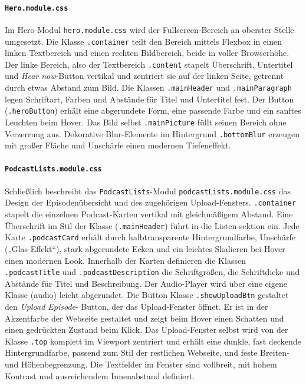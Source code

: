 \documentclass{article}
\begin{document}
\paragraph{\texttt{Hero.module.css}}
Im Hero-Modul \texttt{hero.module.css} wird der Fullscreen-Bereich an oberster Stelle umgesetzt. Die Klasse \texttt{.container} teilt den Bereich mittels Flexbox in einen linken Textbereich und einen rechten Bildbereich, beide in voller Browserhöhe. Der linke Bereich, also der Textbereich \texttt{.content} stapelt Überschrift, Untertitel und \textit{Hear now}-Button vertikal und zentriert sie auf der linken Seite, getrennt durch etwas Abstand zum Bild. Die Klassen \texttt{.mainHeader} und \texttt{.mainParagraph} legen Schriftart, Farben und Abstände für Titel und Untertitel fest. Der Button (\texttt{.heroButton}) erhält eine abgerundete Form, eine passende Farbe und ein sanftes Leuchten beim Hover. Das Bild selbst \texttt{.mainPicture} füllt seinen Bereich ohne Verzerrung aus. Dekorative Blur-Elemente im Hintergrund \texttt{.bottomBlur} erzeugen mit großer Fläche und Unschärfe einen modernen Tiefen­effekt.

\paragraph{\texttt{PodcastLists.module.css}}
\begin{sloppypar}
Schließlich beschreibt das \texttt{PodcastLists}-Modul \texttt{podcastLists.module.css} das Design der Episoden­übersicht und des zugehörigen Upload-Fensters. \texttt{.container} stapelt die einzelnen Podcast-Karten vertikal mit gleichmäßigem Abstand. 
Eine Überschrift im Stil der Klasse (\texttt{.mainHeader}) führt in die Listen-sektion ein. Jede Karte \texttt{.podcastCard} erhält durch halbtransparente Hinter­grund­farbe, Unschärfe („Glas-Effekt“), stark abgerundete Ecken und ein leichtes Skalieren bei Hover einen modernen Look. Innerhalb der Karten definieren die Klassen \texttt{.podcastTitle} und \texttt{.podcastDescription} die Schriftgrößen, die Schriftdicke und Abstände für Titel und Beschreibung. Der Audio-Player wird über eine eigene Klasse (audio) leicht abgerundet. 
Die Button Klasse \texttt{.showUploadBtn} gestaltet den \textit{Upload Episode}- Button, der das Upload-Fenster öffnet. Er ist in der Akzentfarbe der Webseite gestaltet und zeigt beim Hover einen Schatten und einen gedrückten Zustand beim Klick. 
Das Upload-Fenster selbst wird von der Klasse \texttt{.top} komplett im Viewport zentriert und erhält eine dunkle, fast deckende Hintergrundfarbe, passend zum Stil der restlichen Webseite, und feste Breiten- und Höhenbegrenzung. Die Textfelder im Fenster sind voll­breit, mit hohem Kontrast und ausreichendem Innen­abstand definiert. 
\end{sloppypar}
\end{document}
